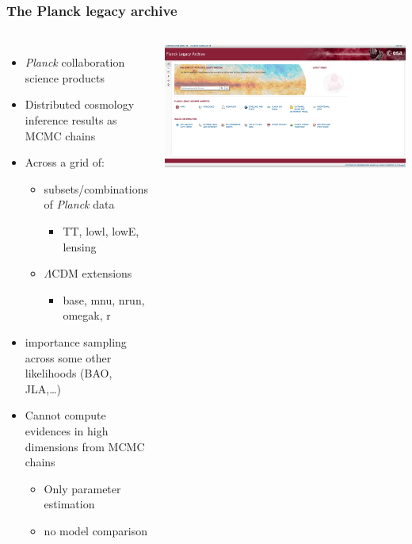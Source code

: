 \documentclass[aspectratio=169]{beamer}
\begin{document}
\begin{frame}
    \frametitle{The Planck legacy archive}
    \begin{columns}
        \begin{itemize}
            \item \textit{Planck} collaboration science products
            \item Distributed cosmology inference results as MCMC chains
            \item Across a grid of:
                \begin{itemize}
                    \item subsets/combinations of \textit{Planck} data
                        \begin{itemize}
                            \item TT, lowl, lowE, lensing
                        \end{itemize}
                    \item $\Lambda$CDM extensions 
                        \begin{itemize}
                            \item base, mnu, nrun, omegak, r
                        \end{itemize}
                \end{itemize}
            \item importance sampling across some other likelihoods (BAO, JLA,\ldots)
            \item Cannot compute evidences in high dimensions from MCMC chains
                \begin{itemize}
                    \item Only parameter estimation
                    \item no model comparison
                \end{itemize}
        \end{itemize}
        \includegraphics[width=\textwidth]{figures/pla}

\end{columns}
\end{frame}
\end{document}

